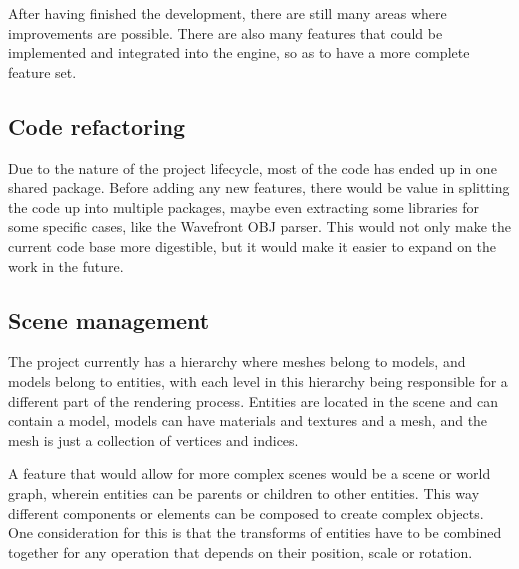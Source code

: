
\label{SEC:RECOMMENDATIONS}

After having finished the development,
there are still many areas where improvements are possible.
There are also many features that could be implemented and integrated into the engine,
so as to have a more complete feature set.

\subsection{Code refactoring}

Due to the nature of the project lifecycle,
most of the code has ended up in one shared package.
Before adding any new features,
there would be value in splitting the code up into multiple packages,
maybe even extracting some libraries for some specific cases,
like the Wavefront OBJ parser.
This would not only make the current code base more digestible,
but it would make it easier to expand on the work in the future.

\subsection{Scene management}

The project currently has a hierarchy where meshes belong to models,
and models belong to entities,
with each level in this hierarchy being responsible for a different part of the rendering process.
Entities are located in the scene and can contain a model,
models can have materials and textures and a mesh,
and the mesh is just a collection of vertices and indices.

A feature that would allow for more complex scenes would be a scene or world graph,
wherein entities can be parents or children to other entities.
This way different components or elements can be composed to create complex objects.
One consideration for this is that the transforms of entities have to be combined together for any operation that depends on their position, scale or rotation.

